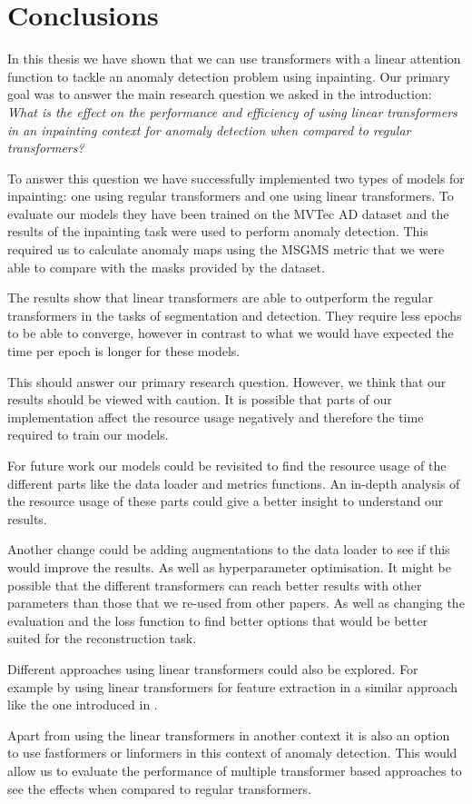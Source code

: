 \chapter{Conclusions}\label{ch:conclusions}

In this thesis we have shown that we can use transformers with a linear attention function to tackle an anomaly detection problem using inpainting. Our primary goal was to answer the main research question we asked in the introduction: \textit{What is the effect on the performance and efficiency of using linear transformers in an inpainting context for anomaly detection when compared to regular transformers?}

To answer this question we have successfully implemented two types of models for inpainting: one using regular transformers and one using linear transformers. To evaluate our models they have been trained on the MVTec AD dataset and the results of the inpainting task were used to perform anomaly detection. This required us to calculate anomaly maps using the MSGMS metric that we were able to compare with the masks provided by the dataset.

The results show that linear transformers are able to outperform the regular transformers in the tasks of segmentation and detection. They require less epochs to be able to converge, however in contrast to what we would have expected the time per epoch is longer for these models.

This should answer our primary research question. However, we think that our results should be viewed with caution. It is possible that parts of our implementation affect the resource usage negatively and therefore the time required to train our models.

For future work our models could be revisited to find the resource usage of the different parts like the data loader and metrics functions. An in-depth analysis of the resource usage of these parts could give a better insight to understand our results.

Another change could be adding augmentations to the data loader to see if this would improve the results. As well as hyperparameter optimisation. It might be possible that the different transformers can reach better results with other parameters than those that we re-used from other papers. As well as changing the evaluation and the loss function to find better options that would be better suited for the reconstruction task.

Different approaches using linear transformers could also be explored. For example by using linear transformers for feature extraction in a similar approach like the one introduced in \cite{yu_fastflow_2021}.

Apart from using the linear transformers in another context it is also an option to use fastformers \cite{wu_fastformer_2021} or linformers \cite{wang_linformer_2020} in this context of anomaly detection. This would allow us to evaluate the performance of multiple transformer based approaches to see the effects when compared to regular transformers.